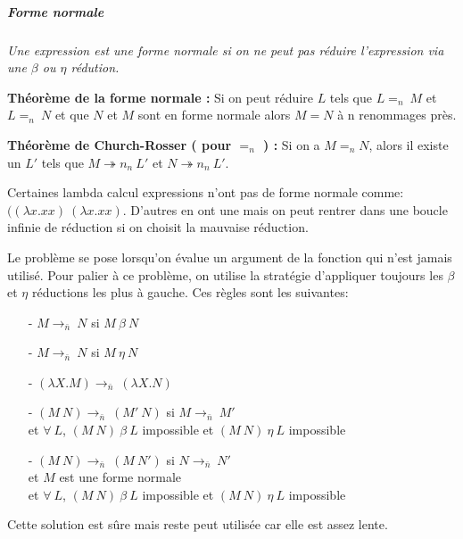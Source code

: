 \documentclass[10pt,a4paper]{article}
\begin{document}
				
				\subparagraph{Forme normale}
			
				\textit{Une expression est une forme normale si on ne peut pas réduire l'expression via une $\beta$ ou $\eta$ rédution.}
				\medbreak
			
				\textbf{Théorème de la forme normale :}
				Si on peut réduire $L$ tels que $L =_{n}~M$ et $L =_{n}~N$ et que $N$ et $M$ sont en forme normale alors $M = N$ à n renommages près.
				\medbreak	
			
				\textbf{Théorème de Church-Rosser ( pour $=_{n}$ ) :}
				Si on a $M =_{n} N$, alors il existe un $L'$ tels que $M \twoheadrightarrow n_{n}~L'$ et $N \twoheadrightarrow n_{n}~L'$.
				\medbreak
			
				Certaines lambda calcul expressions n'ont pas de forme normale comme: $((\lambda x.x x)~(\lambda x.x x)$. 
				D'autres en ont une mais on peut rentrer dans une boucle infinie de réduction si on choisit la mauvaise réduction.
				\medbreak
			
				Le problème se pose lorsqu'on évalue un argument de la fonction qui n'est jamais utilisé. Pour palier à ce problème, on utilise la stratégie d'appliquer toujours les $\beta$ et $\eta$ réductions les plus à gauche. Ces règles sont les suivantes:
				\begin{itemize}
					\item[-] $M \longrightarrow_{\bar{n}}~N$ si $M~\beta~N$
					\item[-] $M \longrightarrow_{\bar{n}}~N$ si $M~\eta~N$
					\item[-] $(\lambda X.M) \longrightarrow_{\bar{n}}~(\lambda X.N)$
					\item[-] $(M~N) \longrightarrow_{\bar{n}}~(M'~N)$ si $M \longrightarrow_{\bar{n}}~M'$
					\\ et $\forall~L$, $(M~N)~\beta~L$ impossible et $(M~N)~\eta~L$ impossible
					\item[-] $(M~N) \longrightarrow_{\bar{n}}~(M~N')$ si $N \longrightarrow_{\bar{n}}~N'$
					\\ et $M$ est une forme normale
					\\ et  $\forall~L$, $(M~N)~\beta~L$ impossible et $(M~N)~\eta~L$ impossible
				\end{itemize}
				\smallbreak
				Cette solution est sûre mais reste peut utilisée car elle est assez lente. 
				\medbreak
				
\end{document}
